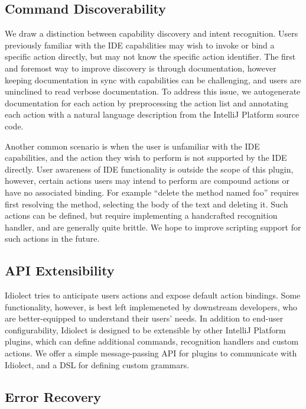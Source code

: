 \documentclass[conference]{IEEEtran}
\begin{document}
\subsection{Command Discoverability}

We draw a distinction between capability discovery and intent recognition. Users previously familiar with the IDE capabilities may wish to invoke or bind a specific action directly, but may not know the specific action identifier. The first and foremost way to improve discovery is through documentation, however keeping documentation in sync with capabilities can be challenging, and users are uninclined to read verbose documentation. To address this issue, we autogenerate documentation for each action by preprocessing the action list and annotating each action with a natural language description from the IntelliJ Platform source code.

Another common scenario is when the user is unfamiliar with the IDE capabilities, and the action they wish to perform is not supported by the IDE directly. User awareness of IDE functionality is outside the scope of this plugin, however, certain actions users may intend to perform are compound actions or have no associated binding. For example ``delete the method named \textlangle foo\textrangle'' requires first resolving the method, selecting the body of the text and deleting it. Such actions can be defined, but require implementing a handcrafted recognition handler, and are generally quite brittle. We hope to improve scripting support for such actions in the future.

\subsection{API Extensibility}

Idiolect tries to anticipate users actions and expose default action bindings. Some functionality, however, is best left implemeneted by downstream developers, who are better-equipped to understand their users' needs. In addition to end-user configurability, Idiolect is designed to be extensible by other IntelliJ Platform plugins, which can define additional commands, recognition handlers and custom actions. We offer a simple message-passing API for plugins to communicate with Idiolect, and a DSL for defining custom grammars.

\subsection{Error Recovery}\label{sec:error}
\end{document}
